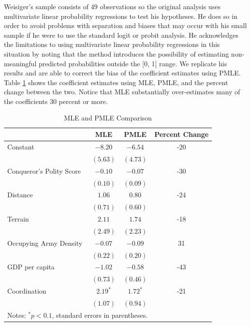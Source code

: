 \documentclass[12pt]{article}
\begin{document}
Weisiger's sample consists of 49 observations so the original analysis uses multivariate linear probability regressions to test his hypotheses. He does so in order to avoid problems with separation and biases that may occur with his small sample if he were to use the standard logit or probit analysis. He acknowledges the limitations to using multivariate linear probability regressions in this situation by noting that the method introduces the possibility of estimating non-meaningful predicted probabilities outside the [0, 1] range. We replicate his results and are able to correct the bias of the coefficient estimates using PMLE. Table \ref{tab:coef} shows the coefficient estimates using MLE, PMLE, and the percent change between the two. Notice that MLE substantially over-estimates many of the coefficients 30 percent or more.

\begin{table}
\begin{center}
\caption{MLE and PMLE Comparison}\label{tab:coef}
\begin{tabular}{l c c c}
\hline
               & MLE & PMLE & Percent Change\\
\hline
Constant & $-8.20$ & $-6.54$ & -20 \\
               & $(5.63)$ & $(4.73)$ \\
Conqueror's Polity Score & $-0.10$ & $-0.07$ & -30 \\
               & $(0.10)$ & $(0.09)$ \\
Distance & $1.06$ & $0.80$ &-24 \\
               & $(0.71)$ & $(0.60)$ \\
Terrain & $2.11$ & $1.74$ &-18 \\
               & $(2.49)$ & $(2.23)$ \\
Occupying Army Density & $-0.07$ & $-0.09$ & 31\\
               & $(0.22)$ & $(0.20)$ \\
GDP per capita & $-1.02$ & $-0.58$ & -43 \\
               & $(0.73)$ & $(0.46)$ \\
Coordination & $2.19^{*}$ & $1.72^{*}$ & -21\\
               & $(1.07)$ & $(0.94)$ \\
\hline
\hline
\multicolumn{3}{l}{\scriptsize Notes: {$^*p<0.1$}, standard errors in parentheses.}
\end{tabular}
\end{center}
\end{table}
\end{document}
